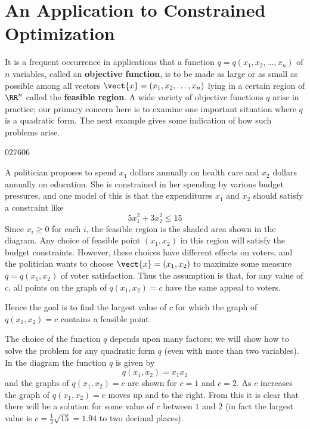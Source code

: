 \section{An Application to Constrained Optimization}
\label{sec:8_9}

It is a frequent occurrence in applications that a function $q = q(x_{1}, x_{2}, \dots, x_{n})$ of $n$ variables, called an \textbf{objective function}, is to be made as large or as small as possible among all vectors $\vect{x} = (x_{1}, x_{2}, \dots, x_{n})$ lying in a certain region of $\RR^n$ called the \textbf{feasible region}. A wide variety of objective functions $q$ arise in practice; our primary concern here is to examine one important situation where $q$ is a quadratic form. The next example gives some indication of how such problems arise.

\newpage
\begin{example}{}{027606}
\begin{wrapfigure}{l}{5cm} 
\centering

\end{wrapfigure}

\setlength{\rightskip}{0pt plus 200pt}
A politician proposes to spend $x_{1}$ dollars annually on health care and $x_{2}$ dollars annually on education. She is constrained in her spending by various budget pressures, and one model of this is that the expenditures $x_{1}$ and $x_{2}$ should satisfy a constraint like
\begin{equation*}
5x_{1}^2 + 3x_{2}^2 \leq 15
\end{equation*}
Since $x_{i} \geq 0$ for each $i$, the feasible region is the shaded area shown in the diagram. Any choice of feasible point $(x_{1}, x_{2})$ in this region will satisfy the budget constraints. However, these choices have different effects on voters, and the politician wants to choose $\vect{x} = (x_{1}, x_{2})$ to maximize some measure $q = q(x_{1}, x_{2})$ of voter satisfaction. Thus the assumption is that, for any value of $c$, all points on the graph of $q(x_{1}, x_{2}) = c$ have the same appeal to voters.

Hence the goal is to find the largest value of $c$ for which the graph of $q(x_{1}, x_{2}) = c$ contains a feasible point.


The choice of the function $q$ depends upon many factors; we will show how to solve the problem for any quadratic form $q$ (even with more than two variables). In the diagram the function $q$ is given by
\begin{equation*}
q(x_{1}, x_{2}) = x_{1}x_{2}
\end{equation*}
and the graphs of $q(x_{1}, x_{2}) = c$ are shown for $c = 1$ and $c = 2$. As $c$ increases the graph of $q(x_{1}, x_{2}) = c$ moves up and to the right. From this it is clear that there will be a solution for some value of $c$ between $1$ and $2$ (in fact the largest value is $c = \frac{1}{2}\sqrt{15} = 1.94$ to two decimal places).
\end{example}

